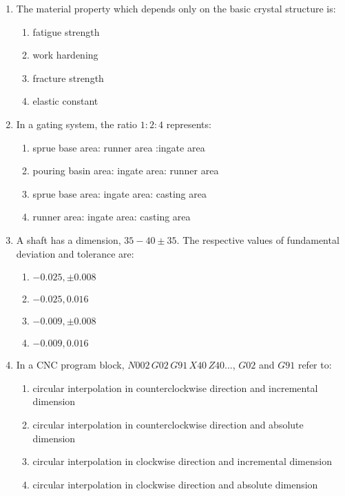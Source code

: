 \documentclass[journal,12pt,twocolumn]{IEEEtran}
\theoremstyle{remark}
\begin{document}
\begin{enumerate}[start=14]
    \item The material property which depends only on the basic crystal structure is:
    \begin{enumerate}
        \item fatigue strength
        \item work hardening
        \item fracture strength
        \item elastic constant
    \end{enumerate}

    \item In a gating system, the ratio $1:2:4$ represents:
    \begin{enumerate}
        \item sprue base area: runner area :ingate area
        \item pouring basin area: ingate area: runner area
        \item sprue base area: ingate area: casting area
        \item runner area: ingate area: casting area
    \end{enumerate}

    \item A shaft has a dimension, $35-40\pm35$. The respective values of fundamental deviation and tolerance are:
    \begin{enumerate}
        \item $-0.025, \pm0.008$
        \item $-0.025, 0.016$
        \item $-0.009, \pm0.008$
        \item $-0.009, 0.016$
    \end{enumerate}

    \item In a CNC program block, $N002 \, G02 \, G91 \, X40 \, Z40...$, $G02$ and $G91$ refer to:
    \begin{enumerate}
        \item circular interpolation in counterclockwise direction and incremental dimension
        \item circular interpolation in counterclockwise direction and absolute dimension
        \item circular interpolation in clockwise direction and incremental dimension
        \item circular interpolation in clockwise direction and absolute dimension
    \end{enumerate}


\end{enumerate}
\end{document}
